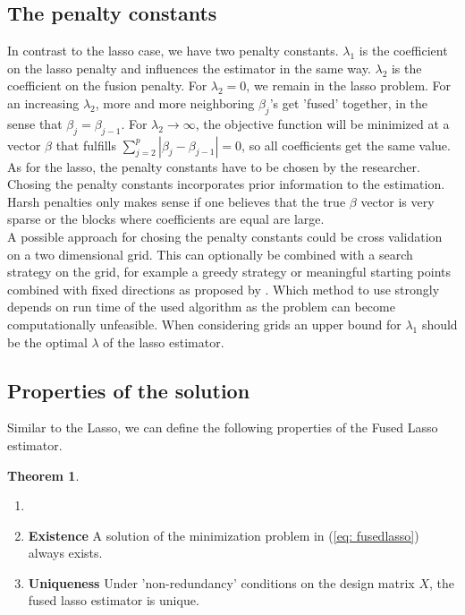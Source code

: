 \documentclass{article}
\theoremstyle{definition}
\newtheorem{theorem}{Theorem}
\begin{document}
\subsection{The penalty constants} \label{subsec: penalties}
In contrast to the lasso case, we have two penalty constants. $\lambda_1$ is the coefficient on the lasso penalty and influences the estimator in the same way. $\lambda_2$ is the coefficient on the fusion penalty.  For $\lambda_2=0$, we remain in the lasso problem. For an increasing $\lambda_2$, more and more neighboring $\beta_j$'s get 'fused' together, in the sense that $\beta_j=\beta_{j-1}$. For $\lambda_2\to\infty$, the objective function will be minimized at a vector $\beta$ that fulfills $\sum_{j=2}^p|\beta_j- \beta_{j-1}|=0$, so all coefficients get the same value.\\
As for the lasso, the penalty constants have to be chosen by the researcher.
Chosing the penalty constants incorporates prior information to the estimation. Harsh penalties only makes sense if one believes that the true $\beta$ vector is very sparse or the blocks where coefficients are equal are large. \\
A possible approach for chosing the penalty constants could be cross validation on a two dimensional grid. This can optionally be combined with a search strategy on the grid, for example a greedy strategy or meaningful starting points combined with fixed directions as proposed by \citep{fused}. Which method to use strongly depends on run time of the used algorithm as the problem can become computationally unfeasible. 
When considering grids an upper bound for $\lambda_1$ should be the optimal $\lambda$ of the lasso estimator.

\subsection{Properties of the solution}

Similar to the Lasso, we can define the following properties of the Fused Lasso estimator.

\begin{theorem}
	\begin{enumerate}
		\item[]
		\item \textbf{Existence} A solution of the minimization problem in (\ref{eq: fusedlasso}) always exists.
		\item \textbf{Uniqueness} \citep{ali2018generalized} Under 'non-redundancy' conditions on the design matrix $X$, the fused lasso estimator is unique.
	\end{enumerate}
\end{theorem}
\end{document}
